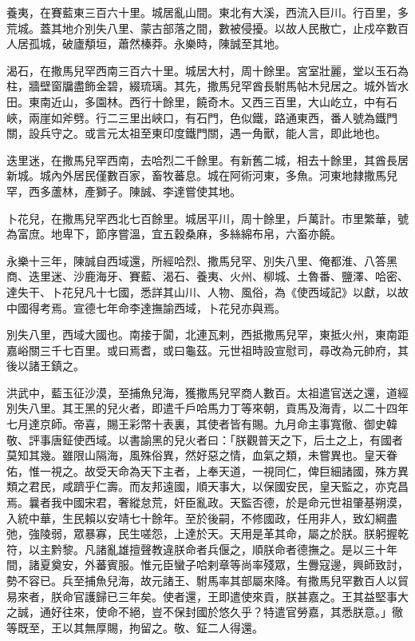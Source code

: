 \begin{pinyinscope}
養夷，在賽藍東三百六十里。城居亂山間。東北有大溪，西流入巨川。行百里，多荒城。蓋其地介別失八里、蒙古部落之間，數被侵擾。以故人民散亡，止戍卒數百人居孤城，破廬頺垣，蕭然榛莽。永樂時，陳誠至其地。

渴石，在撒馬兒罕西南三百六十里。城居大村，周十餘里。宮室壯麗，堂以玉石為柱，牆壁窗牖盡飾金碧，綴琉璃。其先，撒馬兒罕酋長駙馬帖木兒居之。城外皆水田。東南近山，多園林。西行十餘里，饒奇木。又西三百里，大山屹立，中有石峽，兩崖如斧劈。行二三里出峽口，有石門，色似鐵，路通東西，番人號為鐵門關，設兵守之。或言元太祖至東印度鐵門關，遇一角獸，能人言，即此地也。

迭里迷，在撒馬兒罕西南，去哈烈二千餘里。有新舊二城，相去十餘里，其酋長居新城。城內外居民僅數百家，畜牧蕃息。城在阿術河東，多魚。河東地隸撒馬兒罕，西多蘆林，產獅子。陳誠、李達嘗使其地。

卜花兒，在撒馬兒罕西北七百餘里。城居平川，周十餘里，戶萬計。市里繁華，號為富庶。地卑下，節序嘗溫，宜五穀桑麻，多絲綿布帛，六畜亦饒。

永樂十三年，陳誠自西域還，所經哈烈、撒馬兒罕、別失八里、俺都淮、八答黑商、迭里迷、沙鹿海牙、賽藍、渴石、養夷、火州、柳城、土魯番、鹽澤、哈密、達失干、卜花兒凡十七國，悉詳其山川、人物、風俗，為《使西域記》以獻，以故中國得考焉。宣德七年命李達撫諭西域，卜花兒亦與焉。

別失八里，西域大國也。南接于闐，北連瓦剌，西抵撒馬兒罕，東抵火州，東南距嘉峪關三千七百里。或曰焉耆，或曰龜茲。元世祖時設宣慰司，尋改為元帥府，其後以諸王鎮之。

洪武中，藍玉征沙漠，至捕魚兒海，獲撒馬兒罕商人數百。太祖遣官送之還，道經別失八里。其王黑的兒火者，即遣千戶哈馬力丁等來朝，貢馬及海青，以二十四年七月達京師。帝喜，賜王彩幣十表裏，其使者皆有賜。九月命主事寬徹、御史韓敬、評事唐鉦使西域。以書諭黑的兒火者曰：「朕觀普天之下，后土之上，有國者莫知其幾。雖限山隔海，風殊俗異，然好惡之情，血氣之類，未嘗異也。皇天眷佑，惟一視之。故受天命為天下主者，上奉天道，一視同仁，俾巨細諸國，殊方異類之君民，咸躋乎仁壽。而友邦遠國，順天事大，以保國安民，皇天監之，亦克昌焉。曩者我中國宋君，奢縱怠荒，奸臣亂政。天監否德，於是命元世祖肇基朔漠，入統中華，生民賴以安靖七十餘年。至於後嗣，不修國政，任用非人，致幻綱盡弛，強陵弱，眾暴寡，民生嗟怨，上達於天。天用是革其命，屬之於朕。朕躬握乾符，以主黔黎。凡諸亂雄擅聲教違朕命者兵偃之，順朕命者德撫之。是以三十年間，諸夏奠安，外蕃賓服。惟元臣蠻子哈剌章等尚率殘眾，生釁寇邊，興師致討，勢不容已。兵至捕魚兒海，故元諸王、駙馬率其部屬來降。有撒馬兒罕數百人以貿易來者，朕命官護歸已三年矣。使者還，王即遣使來貢，朕甚嘉之。王其益堅事大之誠，通好往來，使命不絕，豈不保封國於悠久乎？特遣官勞嘉，其悉朕意。」徹等既至，王以其無厚賜，拘留之。敬、鉦二人得還。


\end{pinyinscope}
